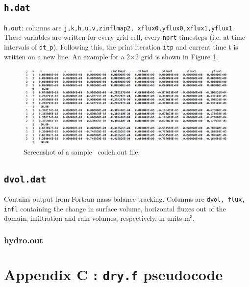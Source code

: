 \documentclass{article}
\newcommand{\code}[1]{\texttt{#1}}
\begin{document}
\subsection{\code{h.dat}}

\code{h.out}: columns are \code{j,k,h,u,v,zinflmap2, xflux0,yflux0,xflux1,yflux1}. 
These variables are written for every grid cell, every \code{nprt} timesteps (i.e. at time intervals of \code{dt\_p}). Following this, the print iteration \code{itp} and current time {t} is written on a new line. An example for a 2$\times$2 grid is shown in Figure \ref{h.out_example}.  

 \begin{figure}[h]
 \centering
\includegraphics[width=35pc]{grid/h_out.png}
 \caption{Screenshot of a sample \	code{h.out} file.}
 \label{h.out_example}
 \end{figure}
  
  


\subsection{\code{dvol.dat}}

Contains output from Fortran mass balance tracking.
Columns are \code{dvol, flux, infl} containing the  change in surface volume, horizontal fluxes out of the domain, infiltration and rain volumes, respectively, in units m$^3$.



\subsubsection*{hydro.out}







\section{Appendix C : \code{dry.f} pseudocode}
\end{document}
